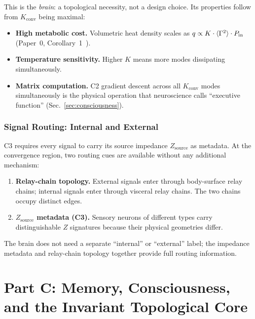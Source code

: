 \documentclass[aps,pre,twocolumn,superscriptaddress,floatfix]{revtex4-2}
\begin{document}
This is the \emph{brain}: a topological necessity, not a
design choice.
Its properties follow from $K_{\text{conv}}$ being maximal:
\begin{itemize}
  \item \textbf{High metabolic cost.}
    Volumetric heat density scales as
    $q \propto K \cdot \langle \Gamma^2 \rangle \cdot P_{\text{in}}$
    (Paper~0, Corollary~1~\cite{Paper0}).
  \item \textbf{Temperature sensitivity.}
    Higher $K$ means more modes dissipating simultaneously.
  \item \textbf{Matrix computation.}
    C2 gradient descent across all $K_{\text{conv}}$ modes
    simultaneously is the physical operation that
    neuroscience calls ``executive function''
    (Sec.~\ref{sec:consciousness}).
\end{itemize}


\section{Signal Routing: Internal and External}
\label{sec:signals}

C3 requires every signal to carry its source impedance
$Z_{\text{source}}$ as metadata.
At the convergence region, two routing cues are available
without any additional mechanism:
\begin{enumerate}
  \item \textbf{Relay-chain topology.}
    External signals enter through body-surface relay
    chains; internal signals enter through visceral
    relay chains.
    The two chains occupy distinct edges.

  \item \textbf{$Z_{\text{source}}$ metadata (C3).}
    Sensory neurons of different types carry
    distinguishable $Z$ signatures because their
    physical geometries differ.
\end{enumerate}

\noindent
The brain does not need a separate ``internal'' or
``external'' label; the impedance metadata and
relay-chain topology together provide full routing
information.



\part*{Part C: Memory, Consciousness, and the Invariant Topological Core}
\end{document}
